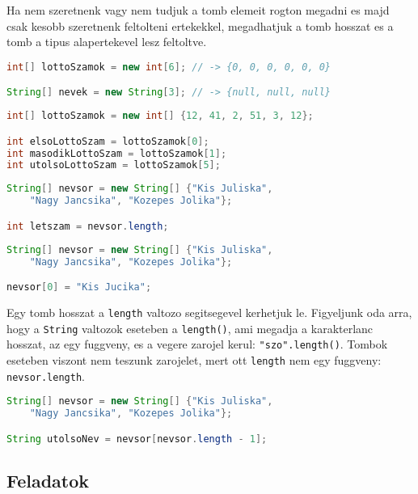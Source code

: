 \documentclass{article}
\begin{document}
Ha nem szeretnenk vagy nem tudjuk a tomb elemeit rogton megadni es majd csak kesobb szeretnenk feltolteni ertekekkel, megadhatjuk a tomb hosszat es a tomb a tipus alapertekevel lesz feltoltve.

\begin{lstlisting}[language=Java, caption=Tomb letrehozas 3. modszere]
int[] lottoSzamok = new int[6]; // -> {0, 0, 0, 0, 0, 0}

String[] nevek = new String[3]; // -> {null, null, null}
\end{lstlisting}

\begin{lstlisting}[language=Java, caption=Tomb elemeinek elerese indexekkel]
int[] lottoSzamok = new int[] {12, 41, 2, 51, 3, 12};

int elsoLottoSzam = lottoSzamok[0];
int masodikLottoSzam = lottoSzamok[1];
int utolsoLottoSzam = lottoSzamok[5];
\end{lstlisting}

\begin{lstlisting}[language=Java, caption=Tomb hosszanak lekerdezese]
String[] nevsor = new String[] {"Kis Juliska",
    "Nagy Jancsika", "Kozepes Jolika"};

int letszam = nevsor.length;
\end{lstlisting}

\begin{lstlisting}[language=Java, caption=Tomb modositasa]
String[] nevsor = new String[] {"Kis Juliska",
    "Nagy Jancsika", "Kozepes Jolika"};

nevsor[0] = "Kis Jucika";
\end{lstlisting}

Egy tomb hosszat a \lstinline{length} valtozo segitsegevel kerhetjuk le. Figyeljunk oda arra, hogy a \lstinline{String} valtozok eseteben a \lstinline{length()}, ami megadja a karakterlanc hosszat, az egy fuggveny, es a vegere zarojel kerul: \lstinline{"szo".length()}. Tombok eseteben viszont nem teszunk zarojelet, mert ott \lstinline{length} nem egy fuggveny: \lstinline{nevsor.length}.

\begin{lstlisting}[language=Java, caption=Utolso elem indexenek szamolasa]
String[] nevsor = new String[] {"Kis Juliska",
    "Nagy Jancsika", "Kozepes Jolika"};

String utolsoNev = nevsor[nevsor.length - 1];
\end{lstlisting}

\subsection{Feladatok}
\end{document}
